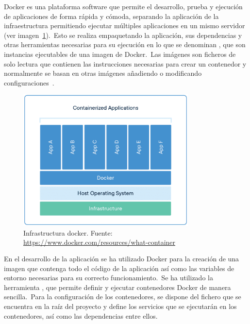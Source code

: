 
Docker es una plataforma software que permite el desarrollo, prueba y ejecución de aplicaciones de forma rápida y
cómoda, separando la aplicación de la infraestructura permitiendo ejecutar múltiples aplicaciones en un mismo servidor
(ver imagen~\ref{fig:docker-container-infrastructure}).\ Esto se realiza empaquetando la
aplicación, sus dependencias y otras herramientas necesarias para su ejecución en lo que se denominan
, que son instancias ejecutables de una imagen de Docker.\ Las imágenes son ficheros de solo
lectura que contienen las instrucciones necesarias para crear un contenedor y normalmente se basan en otras imágenes
añadiendo o modificando configuraciones~\cite{docker-docs}.

\begin{figure}[ht]
	\centering
	\includegraphics[width=0.8\textwidth]{res/images/container-what-is-container}
	\caption{Infrastructura docker. Fuente: \url{https://www.docker.com/resources/what-container}}
	\label{fig:docker-container-infrastructure}
\end{figure}

En el desarrollo de la aplicación se ha utilizado Docker para la creación de una imagen que contenga todo el código de
la aplicación así como las variables de entorno necesarias para su correcto funcionamiento.\ Se ha
utilizado la herramienta , que permite definir y ejecutar contenedores Docker de manera
sencilla.\ Para la configuración de los contenedores, se dispone del fichero  que se
encuentra en la raíz del proyecto y define los servicios que se ejecutarán en los contenedores, así como
las dependencias entre ellos.

